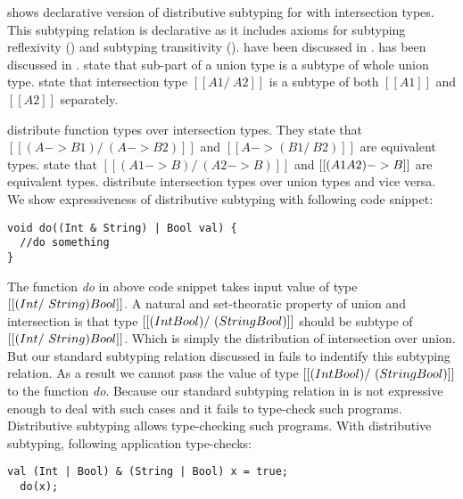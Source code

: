  shows declarative version of distributive subtyping for \cal with intersection types.
This subtyping relation is declarative as it includes axioms for subtyping reflexivity () and
subtyping transitivity ().  have been
discussed in .  has been discussed in .
 state that sub-part of a union type is a subtype of whole union type.
 state that intersection type $[[A1 /\ A2]]$ is a subtype of both $[[A1]]$
and $[[A2]]$ separately.

  distribute function types over intersection types.
They state that $[[(A -> B1) /\ (A -> B2)]]$ and $[[A -> (B1 /\ B2)]]$ are equivalent types.
 state that $[[(A1 -> B) /\ (A2 -> B)]]$ and $[[(A1 \/ A2) -> B]]$
are equivalent types.
 distribute intersection types over union types and vice versa.
We show expressiveness of distributive subtyping with following code snippet:

\begin{lstlisting}[xleftmargin=.2\textwidth, xrightmargin=.2\textwidth]
void do((Int & String) | Bool val) {
  //do something
}
\end{lstlisting}

\noindent The function \emph{do} in above code snippet takes input value of type 
$[[(Int /\ String) \/ Bool]]$. A natural and set-theoratic property of union and
intersection is that type $[[(Int \/ Bool) /\ (String \/ Bool)]]$ should be
subtype of $[[(Int /\ String) \/ Bool]]$. Which is simply the distribution
of intersection over union.
But our standard subtyping relation discussed in 
fails to indentify this subtyping relation.
As a result we cannot pass the
value of type $[[(Int \/ Bool) /\ (String \/ Bool)]]$ to the function
\emph{do}. Because our standard subtyping relation in 
is not expressive enough to deal with such cases and it fails to type-check such
programs. Distributive subtyping allows type-checking such programs.
With distributive subtyping, following application type-checks:

\begin{lstlisting}[xleftmargin=.2\textwidth, xrightmargin=.2\textwidth]
  val (Int | Bool) & (String | Bool) x = true;
  do(x);
\end{lstlisting}

